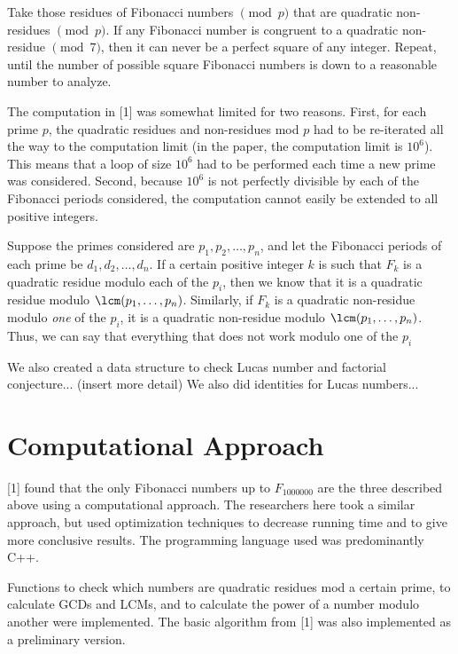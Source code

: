 \documentclass[11pt]{article}
\begin{document}
Take those residues of Fibonacci numbers $\pmod{p}$ that are quadratic non-residues $\pmod{p}$. If any Fibonacci number is congruent to a quadratic non-residue $\pmod{7}$, then it can never be a perfect square of any integer. Repeat, until the number of possible square Fibonacci numbers is down to a reasonable number to analyze.

The computation in [1] was somewhat limited for two reasons. First, for each prime $p$, the quadratic residues and non-residues mod $p$ had to be re-iterated all the way to the computation limit (in the paper, the computation limit is $10^6$). This means that a loop of size $10^6$ had to be performed each time a new prime was considered. Second, because $10^6$ is not perfectly divisible by each of the Fibonacci periods considered, the computation cannot easily be extended to all positive integers.

Suppose the primes considered are $p_1, p_2, \dots , p_n$, and let the Fibonacci periods of each prime be $d_1, d_2, \dots , d_n$. If a certain positive integer $k$ is such that $F_k$ is a quadratic residue modulo each of the $p_i$, then we know that it is a quadratic residue modulo $\lcm(p_1, \dots , p_n)$. Similarly, if $F_k$ is a quadratic non-residue modulo \textit{one} of the $p_i$, it is a quadratic non-residue modulo $\lcm(p_1, \dots , p_n)$. Thus, we can say that everything that does not work modulo one of the $p_i$ 

We also created a data structure to check Lucas number and factorial conjecture... (insert more detail) We also did identities for Lucas numbers...

\section{Computational Approach}

[1] found that the only Fibonacci numbers up to $F_{1000000}$ are the three described above using a computational approach. The researchers here took a similar approach, but used optimization techniques to decrease running time and to give more conclusive results. The programming language used was predominantly C++.

Functions to check which numbers are quadratic residues mod a certain prime, to calculate GCDs and LCMs, and to calculate the power of a number modulo another were implemented. The basic algorithm from [1] was also implemented as a preliminary version.
\end{document}
